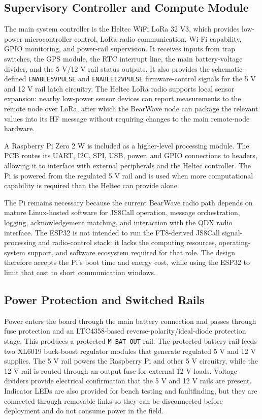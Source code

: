 \documentclass[acmsmall,screen]{acmart}
\begin{document}
\subsection{Supervisory Controller and Compute Module}
The main system controller is the Heltec WiFi LoRa 32 V3, which provides low-power microcontroller control, LoRa radio communication, Wi-Fi capability, GPIO monitoring, and power-rail supervision. It receives inputs from trap switches, the GPS module, the RTC interrupt line, the main battery-voltage divider, and the 5 V/12 V rail status outputs. It also provides the schematic-defined \texttt{ENABLE5VPULSE} and \texttt{ENABLE12VPULSE} firmware-control signals for the 5 V and 12 V rail latch circuitry. The Heltec LoRa radio supports local sensor expansion: nearby low-power sensor devices can report measurements to the remote node over LoRa, after which the BearWave node can package the relevant values into its HF message without requiring changes to the main remote-node hardware.

A Raspberry Pi Zero 2 W is included as a higher-level processing module. The PCB routes its UART, I2C, SPI, USB, power, and GPIO connections to headers, allowing it to interface with external peripherals and the Heltec controller. The Pi is powered from the regulated 5 V rail and is used when more computational capability is required than the Heltec can provide alone.

The Pi remains necessary because the current BearWave radio path depends on mature Linux-hosted software for JS8Call operation, message orchestration, logging, acknowledgement matching, and interaction with the QDX radio interface. The ESP32 is not intended to run the FT8-derived JS8Call signal-processing and radio-control stack: it lacks the computing resources, operating-system support, and software ecosystem required for that role. The design therefore accepts the Pi's boot time and energy cost, while using the ESP32 to limit that cost to short communication windows.

\subsection{Power Protection and Switched Rails}
Power enters the board through the main battery connection and passes through fuse protection and an LTC4358-based reverse-polarity/ideal-diode protection stage. This produces a protected \texttt{M\_BAT\_OUT} rail. The protected battery rail feeds two XL6019 buck-boost regulator modules that generate regulated 5 V and 12 V supplies. The 5 V rail powers the Raspberry Pi and other 5 V circuitry, while the 12 V rail is routed through an output fuse for external 12 V loads. Voltage dividers provide electrical confirmation that the 5 V and 12 V rails are present. Indicator LEDs are also provided for bench testing and faultfinding, but they are connected through removable links so they can be disconnected before deployment and do not consume power in the field.
\end{document}
